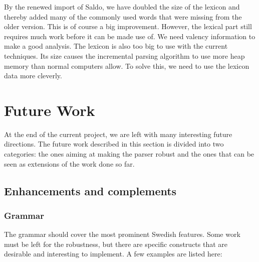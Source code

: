 \documentclass{report}
\begin{document}
By the renewed import of Saldo, we have doubled the size of the lexicon and thereby
added many of the commonly used words that were missing from the older
version. This is of course a big improvement.
However, the lexical part still requires much work before it can be made use of.
We need valency information to make a good analysis. The lexicon is also too
big to use with the current techniques. Its size causes the
incremental parsing algorithm to use more heap memory than normal computers
allow. To solve this, we need to use the lexicon data more cleverly.

%
%

\section{Future Work}
\label{sec:future}
At the end of the current project,
we are left with 
many interesting future directions.
The future work described in this section is divided into two categories:
the ones aiming at making the parser robust and the ones that can be
seen as extensions of the work done so far.
 
\subsection{Enhancements and complements}
\subsubsection{Grammar}
The grammar should cover the most prominent Swedish features.
Some work must be left for the robustness, but there are specific constructs
that are desirable and interesting to implement. A few examples are listed here:\\
\end{document}
